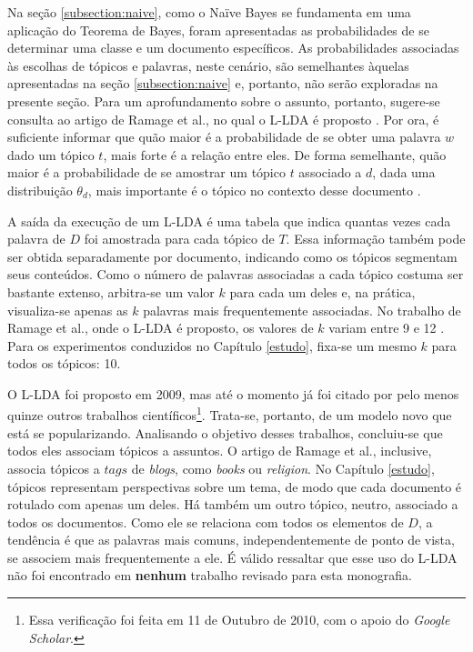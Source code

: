 Na seção \ref{subsection:naive}, como o Naïve Bayes se fundamenta em uma aplicação do Teorema de Bayes, foram apresentadas as probabilidades de se determinar uma classe e um documento específicos. As probabilidades associadas às escolhas de tópicos e palavras, neste cenário, são semelhantes àquelas apresentadas na seção \ref{subsection:naive} e, portanto, não serão exploradas na presente seção. Para um aprofundamento sobre o assunto, portanto, sugere-se consulta ao artigo de Ramage et al., no qual o L-LDA é proposto \cite{llda}. Por ora, é suficiente informar que quão maior é a probabilidade de se obter uma palavra \ensuremath{w} dado um tópico \ensuremath{t}, mais forte é a relação entre eles. De forma semelhante, quão maior é a probabilidade de se amostrar um tópico \ensuremath{t} associado a \ensuremath{d}, dada uma distribuição \ensuremath{\theta_d}, mais importante é o tópico no contexto desse documento \cite{pnas}.

A saída da execução de um L-LDA é uma tabela que indica quantas vezes cada palavra de \ensuremath{D} foi amostrada para cada tópico de \ensuremath{T}. Essa informação também pode ser obtida separadamente por documento, indicando como os tópicos segmentam seus conteúdos. Como o número de palavras associadas a cada tópico costuma ser bastante extenso, arbitra-se um valor \ensuremath{k} para cada um deles e, na prática, visualiza-se apenas as \ensuremath{k} palavras mais frequentemente associadas. No trabalho de Ramage et al., onde o L-LDA é proposto, os valores de \ensuremath{k} variam entre 9 e 12 \cite{llda}. Para os experimentos conduzidos no Capítulo \ref{estudo}, fixa-se um mesmo \ensuremath{k} para todos os tópicos: 10.  

O L-LDA foi proposto em 2009, mas até o momento já foi citado por pelo menos quinze outros trabalhos científicos\footnote{Essa verificação foi feita em 11 de Outubro de 2010, com o apoio do \emph{Google Scholar}.}. Trata-se, portanto, de um modelo novo que está se popularizando. Analisando o objetivo desses trabalhos, concluiu-se que todos eles associam tópicos a assuntos. O artigo de Ramage et al., inclusive, associa tópicos a \ensuremath{tags} de \emph{blogs}, como \emph{books} ou \emph{religion}. No Capítulo \ref{estudo}, tópicos representam perspectivas sobre um tema, de modo que cada documento é rotulado com apenas um deles. Há também um outro tópico, neutro, associado a todos os documentos. Como ele se relaciona com todos os elementos de \ensuremath{D}, a tendência é que as palavras mais comuns, independentemente de ponto de vista, se associem mais frequentemente a ele.  É válido ressaltar que esse uso do L-LDA não foi encontrado em \textbf{nenhum} trabalho revisado para esta monografia. 

